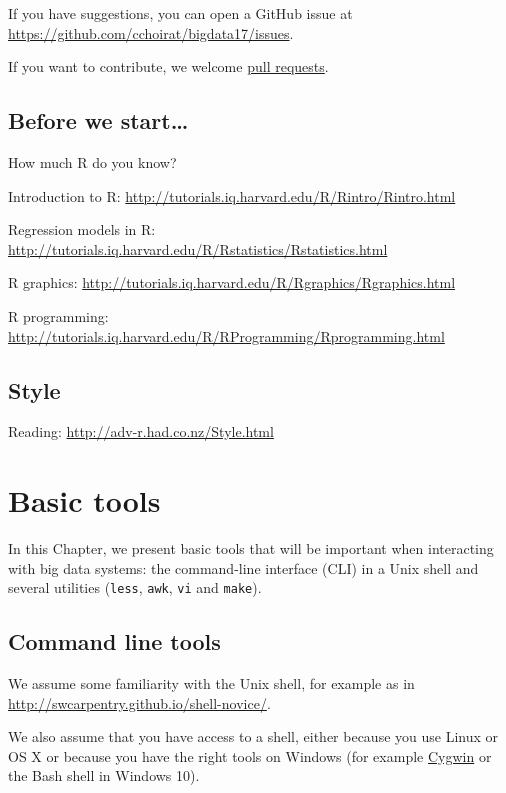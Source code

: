 \documentclass[]{book}
\theoremstyle{definition}
\theoremstyle{definition}
\theoremstyle{definition}
\theoremstyle{remark}
\begin{document}
If you have suggestions, you can open a GitHub issue at
\url{https://github.com/cchoirat/bigdata17/issues}.

If you want to contribute, we welcome
\href{https://help.github.com/articles/about-pull-requests/}{pull
requests}.

\section{Before we start\ldots{}}\label{before-we-start}

How much R do you know?

Introduction to R:
\url{http://tutorials.iq.harvard.edu/R/Rintro/Rintro.html}

Regression models in R:
\url{http://tutorials.iq.harvard.edu/R/Rstatistics/Rstatistics.html}

R graphics:
\url{http://tutorials.iq.harvard.edu/R/Rgraphics/Rgraphics.html}

R programming:
\url{http://tutorials.iq.harvard.edu/R/RProgramming/Rprogramming.html}

\section{Style}\label{style}

Reading: \url{http://adv-r.had.co.nz/Style.html}

\chapter{Basic tools}\label{basics}

In this Chapter, we present basic tools that will be important when
interacting with big data systems: the command-line interface (CLI) in a
Unix shell and several utilities (\texttt{less}, \texttt{awk},
\texttt{vi} and \texttt{make}).

\section{Command line tools}\label{command-line-tools}

We assume some familiarity with the Unix shell, for example as in
\url{http://swcarpentry.github.io/shell-novice/}.

We also assume that you have access to a shell, either because you use
Linux or OS X or because you have the right tools on Windows (for
example \href{https://www.cygwin.com/}{Cygwin} or the Bash shell in
Windows 10).
\end{document}
